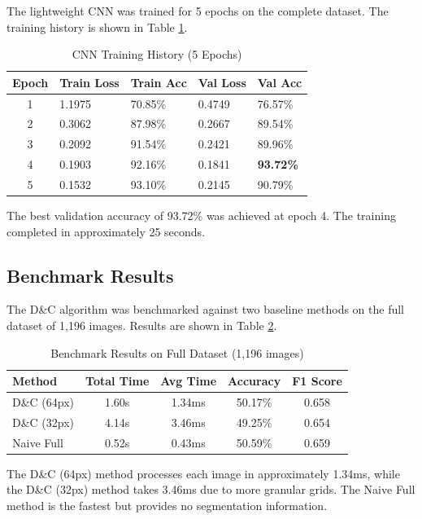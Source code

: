 \documentclass[conference]{IEEEtran}
\begin{document}
The lightweight CNN was trained for 5 epochs on the complete dataset. The training history is shown in Table \ref{tab:training}.

\begin{table}[htbp]
\centering
\caption{CNN Training History (5 Epochs)}
\label{tab:training}
\begin{tabular}{@{}cllll@{}}
\toprule
\textbf{Epoch} & \textbf{Train Loss} & \textbf{Train Acc} & \textbf{Val Loss} & \textbf{Val Acc} \\
\midrule
1 & 1.1975 & 70.85\% & 0.4749 & 76.57\% \\
2 & 0.3062 & 87.98\% & 0.2667 & 89.54\% \\
3 & 0.2092 & 91.54\% & 0.2421 & 89.96\% \\
4 & 0.1903 & 92.16\% & 0.1841 & \textbf{93.72\%} \\
5 & 0.1532 & 93.10\% & 0.2145 & 90.79\% \\
\bottomrule
\end{tabular}
\end{table}

The best validation accuracy of 93.72\% was achieved at epoch 4. The training completed in approximately 25 seconds.

\subsection{Benchmark Results}

The D\&C algorithm was benchmarked against two baseline methods on the full dataset of 1,196 images. Results are shown in Table \ref{tab:benchmark}.

\begin{table}[htbp]
\centering
\caption{Benchmark Results on Full Dataset (1,196 images)}
\label{tab:benchmark}
\begin{tabular}{@{}lcccc@{}}
\toprule
\textbf{Method} & \textbf{Total Time} & \textbf{Avg Time} & \textbf{Accuracy} & \textbf{F1 Score} \\
\midrule
D\&C (64px) & 1.60s & 1.34ms & 50.17\% & 0.658 \\
D\&C (32px) & 4.14s & 3.46ms & 49.25\% & 0.654 \\
Naive Full & 0.52s & 0.43ms & 50.59\% & 0.659 \\
\bottomrule
\end{tabular}
\end{table}

The D\&C (64px) method processes each image in approximately 1.34ms, while the D\&C (32px) method takes 3.46ms due to more granular grids. The Naive Full method is the fastest but provides no segmentation information.
\end{document}
